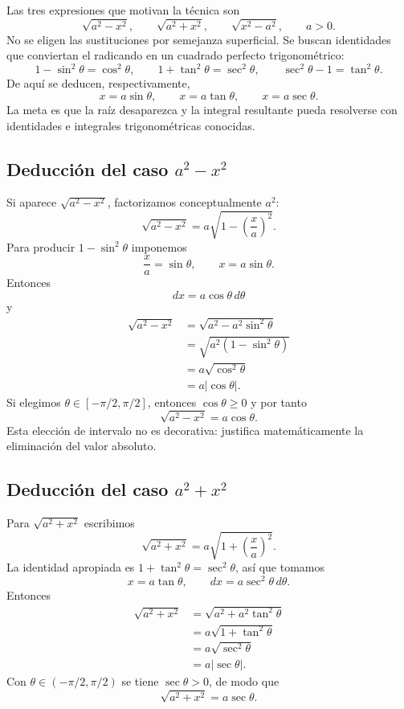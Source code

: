 \documentclass[12pt]{article}
\theoremstyle{definition}
\theoremstyle{remark}
\begin{document}
Las tres expresiones que motivan la técnica son
\[
\sqrt{a^2-x^2},\qquad \sqrt{a^2+x^2},\qquad \sqrt{x^2-a^2},\qquad a>0.
\]
No se eligen las sustituciones por semejanza superficial. Se buscan identidades que conviertan el radicando en un cuadrado perfecto trigonométrico:
\[
1-\sin^2\theta=\cos^2\theta,\qquad
1+\tan^2\theta=\sec^2\theta,\qquad
\sec^2\theta-1=\tan^2\theta.
\]
De aquí se deducen, respectivamente,
\[
x=a\sin\theta,\qquad x=a\tan\theta,\qquad x=a\sec\theta.
\]
La meta es que la raíz desaparezca y la integral resultante pueda resolverse con identidades e integrales trigonométricas conocidas.

\subsection*{Deducción del caso \texorpdfstring{$a^2-x^2$}{a2-x2}}

Si aparece $\sqrt{a^2-x^2}$, factorizamos conceptualmente $a^2$:
\[
\sqrt{a^2-x^2}=a\sqrt{1-\left(\frac{x}{a}\right)^2}.
\]
Para producir $1-\sin^2\theta$ imponemos
\[
\frac{x}{a}=\sin\theta,\qquad x=a\sin\theta.
\]
Entonces
\[
dx=a\cos\theta\,d\theta
\]
y
\begin{align*}
\sqrt{a^2-x^2}
&=\sqrt{a^2-a^2\sin^2\theta}\\
&=\sqrt{a^2(1-\sin^2\theta)}\\
&=a\sqrt{\cos^2\theta}\\
&=a|\cos\theta|.
\end{align*}
Si elegimos $\theta\in[-\pi/2,\pi/2]$, entonces $\cos\theta\ge0$ y por tanto
\[
\sqrt{a^2-x^2}=a\cos\theta.
\]
Esta elección de intervalo no es decorativa: justifica matemáticamente la eliminación del valor absoluto.

\subsection*{Deducción del caso \texorpdfstring{$a^2+x^2$}{a2+x2}}

Para $\sqrt{a^2+x^2}$ escribimos
\[
\sqrt{a^2+x^2}=a\sqrt{1+\left(\frac{x}{a}\right)^2}.
\]
La identidad apropiada es $1+\tan^2\theta=\sec^2\theta$, así que tomamos
\[
x=a\tan\theta,
\qquad dx=a\sec^2\theta\,d\theta.
\]
Entonces
\begin{align*}
\sqrt{a^2+x^2}
&=\sqrt{a^2+a^2\tan^2\theta}\\
&=a\sqrt{1+\tan^2\theta}\\
&=a\sqrt{\sec^2\theta}\\
&=a|\sec\theta|.
\end{align*}
Con $\theta\in(-\pi/2,\pi/2)$ se tiene $\sec\theta>0$, de modo que
\[
\sqrt{a^2+x^2}=a\sec\theta.
\]
\end{document}
